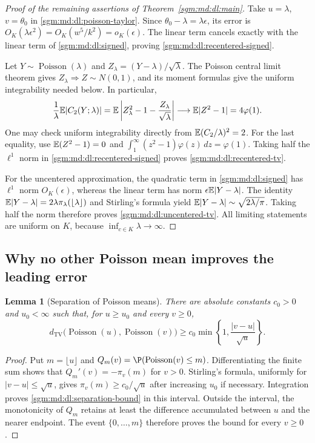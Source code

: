 \documentclass[11pt,letterpaper]{article}
\newtheorem{lemma}[theorem]{Lemma}\newtheorem{proposition}[theorem]{Proposition}\newtheorem{corollary}[theorem]{Corollary}
\theoremstyle{remark}\newtheorem{remark}[theorem]{Remark}
\newcommand{\Poi}{\operatorname{Poisson}}\newcommand{\Bin}{\operatorname{Bin}}
\theoremstyle{definition}\newtheorem{definition}[theorem]{Definition}
\newcommand{\TV}{d_{\mathrm{TV}}}
\begin{document}
\begin{proof}[Proof of the remaining assertions of Theorem~\ref{sgm:md:dl:main}]
Take $u=\lambda$, $v=\theta_0$ in
\eqref{sgm:md:dl:poisson-taylor}.  Since $\theta_0-\lambda=\lambda\epsilon$,
its error is
$O_K(\lambda\epsilon^2)=O_K(w^5/k^2)=o_K(\epsilon)$.
The linear term cancels exactly with the linear term of
\eqref{sgm:md:dl:signed}, proving \eqref{sgm:md:dl:recentered-signed}.

Let $Y\sim\Poi(\lambda)$ and $Z_\lambda=(Y-\lambda)/\sqrt\lambda$.
The Poisson central limit theorem gives $Z_\lambda\Rightarrow Z\sim N(0,1)$,
and its moment formulas give the uniform integrability needed below.
In particular,
\[
 \frac{1}{\lambda}\mathbb E|C_2(Y;\lambda)|
 =\mathbb E\left|Z_\lambda^2-1-\frac{Z_\lambda}{\sqrt\lambda}\right|
 \longrightarrow\mathbb E|Z^2-1|=4\varphi(1).
\]
One may check uniform integrability directly from
$\mathbb E(C_2/\lambda)^2=2$.
For the last equality, use $\mathbb E(Z^2-1)=0$ and
$\int_1^\infty(z^2-1)\varphi(z)\,dz=\varphi(1)$.
Taking half the $\ell^1$ norm in \eqref{sgm:md:dl:recentered-signed}
proves \eqref{sgm:md:dl:recentered-tv}.

For the uncentered approximation, the quadratic term in
\eqref{sgm:md:dl:signed} has $\ell^1$ norm $O_K(\epsilon)$, whereas the linear
term has norm $\epsilon\mathbb E|Y-\lambda|$.
The identity
$\mathbb E|Y-\lambda|=2\lambda\pi_\lambda(\lfloor\lambda\rfloor)$ and
Stirling's formula yield
$\mathbb E|Y-\lambda|\sim\sqrt{2\lambda/\pi}$.
Taking half the norm therefore proves
\eqref{sgm:md:dl:uncentered-tv}.  All limiting statements are uniform on $K$,
because $\inf_{c\in K}\lambda\to\infty$.
\end{proof}

\subsection{Why no other Poisson mean improves the leading error}

\begin{lemma}[Separation of Poisson means]
\label{sgm:md:dl:separation}
There are absolute constants $c_0>0$ and $u_0<\infty$ such that, for
$u\ge u_0$ and every $v\ge0$,
\begin{equation}\label{sgm:md:dl:separation-bound}
 \TV\bigl(\Poi(u),\Poi(v)\bigr)
 \ge c_0\min\left\{1,\frac{|v-u|}{\sqrt u}\right\}.
\end{equation}
\end{lemma}

\begin{proof}
Put $m=\lfloor u\rfloor$ and
$Q_m(v)=\P(\Poi(v)\le m)$.
Differentiating the finite sum shows that
$Q_m'(v)=-\pi_v(m)$ for $v>0$.
Stirling's formula, uniformly for $|v-u|\le\sqrt u$, gives
$\pi_v(m)\ge c_0/\sqrt u$ after increasing $u_0$ if necessary.
Integration proves \eqref{sgm:md:dl:separation-bound} in this interval.
Outside the interval, the monotonicity of $Q_m$ retains at least the
difference accumulated between $u$ and the nearer endpoint.
The event $\{0,\ldots,m\}$ therefore proves the bound for every $v\ge0$.
\end{proof}
\end{document}
